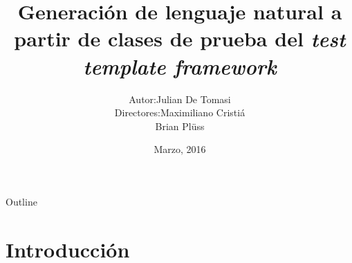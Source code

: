 \documentclass{beamer}
\begin{document}
  
\title[NLG a partir de clases de prueba del TTF]{Generación de lenguaje natural a partir de clases de prueba del \textit{test template framework}}
\author[Julian De Tomasi]{\begin{tabular}{r@{ }l} 
  Autor:      & Julian De Tomasi \\[1ex]
  Directores: & Maximiliano Cristiá\\
  & Brian Plüss
  \end{tabular}}
\date{Marzo, 2016}
  
\begin{frame}
  \titlepage
\end{frame}
  
\begin{frame}{Outline}
  \tableofcontents
\end{frame}
  
\section{Introducción}
  
\end{document}
